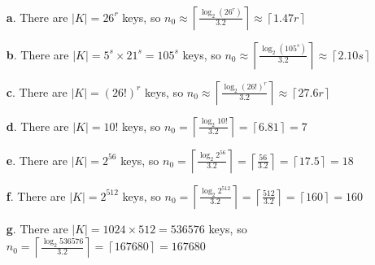 \documentclass[11pt]{article}
\begin{document}
\bigskip{}
\begin{itemize}
  \item[{\bf a}.] There are $|K| = 26^r$ keys,
                  so $n_0 \approx\left\lceil\frac{\log_2(26^r)}{3.2}\right\rceil
                          \approx\left\lceil1.47r\right\rceil$
  \item[{\bf b}.] There are $|K| = 5^s\times 21^s = 105^s$ keys,
                  so $n_0 \approx\left\lceil\frac{\log_2(105^s)}{3.2}\right\rceil
                          \approx\left\lceil2.10s\right\rceil$
  \item[{\bf c}.] There are $|K| = (26!)^r$ keys,
                  so $n_0 \approx\left\lceil\frac{\log_2 (26!)^r}{3.2}\right\rceil
                          \approx\left\lceil27.6r\right\rceil$
  \item[{\bf d}.] There are $|K| = 10!$ keys,
                  so $n_0 = \left\lceil\frac{\log_2 10!}{3.2}\right\rceil
                          = \left\lceil 6.81\right\rceil
                          = 7$
  \item[{\bf e}.] There are $|K| = 2^{56}$ keys,
                  so $n_0 = \left\lceil\frac{\log_2 2^{56}}{3.2}\right\rceil
                          = \left\lceil\frac{56}{3.2}\right\rceil
                          = \left\lceil 17.5\right\rceil
                          = 18$
  \item[{\bf f}.] There are $|K| = 2^{512}$ keys,
                  so $n_0 = \left\lceil\frac{\log_2 2^{512}}{3.2}\right\rceil
                          = \left\lceil\frac{512}{3.2}\right\rceil
                          = \left\lceil 160\right\rceil
                          = 160$
  \item[{\bf g}.] There are $|K| = 1024\times512 = 536576$ keys,
                  so $n_0 = \left\lceil\frac{\log_2 536576}{3.2}\right\rceil
                          = \left\lceil 167680\right\rceil
                          = 167680$
\end{itemize}
\end{document}
